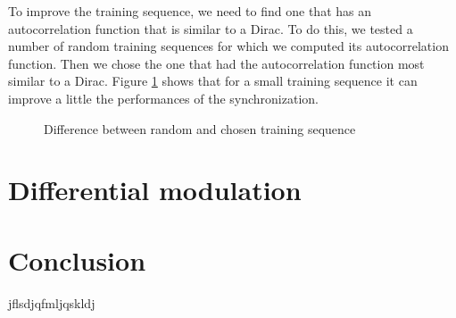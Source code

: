 \documentclass[a4paper,12pt]{article}
\begin{document}
To improve the training sequence, we need to find one that has an autocorrelation function that is similar to a Dirac. To do this, we tested a number of random training sequences for which we computed its autocorrelation function. Then we chose the one that had the autocorrelation function most similar to a Dirac. Figure \ref{train} shows that for a small training sequence it can improve a little the performances of the synchronization.

\begin{figure}[ht!]
\caption{Difference between random and chosen training sequence}
\label{train}
\end{figure}

\newpage
\section{Differential modulation}


\section*{Conclusion}
\vspace{1cm}
jflsdjqfmljqskldj

\appendix
\end{document}
